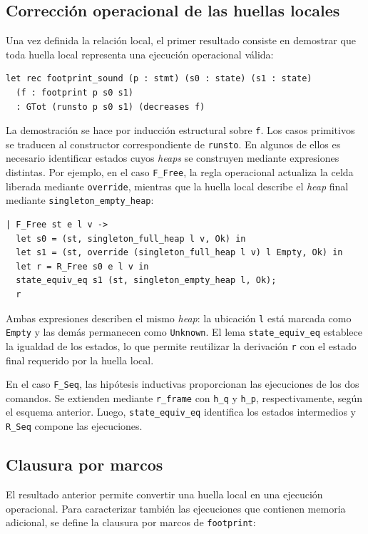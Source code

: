 \documentclass[a4paper,	11pt]{report}
\begin{document}
\subsection*{Corrección operacional de las huellas locales}
Una vez definida la relación local,
el primer resultado consiste en demostrar que toda huella local representa una ejecución operacional válida:

\begin{lstlisting}
let rec footprint_sound (p : stmt) (s0 : state) (s1 : state)
  (f : footprint p s0 s1)
  : GTot (runsto p s0 s1) (decreases f)
\end{lstlisting}

La demostración se hace por inducción estructural sobre \lstinline|f|.
Los casos primitivos se traducen al constructor correspondiente de \lstinline|runsto|.
En algunos de ellos es necesario identificar estados cuyos \emph{heaps} se construyen mediante expresiones distintas.
Por ejemplo,
en el caso \lstinline|F_Free|,
la regla operacional actualiza la celda liberada mediante \lstinline|override|,
mientras que la huella local describe el \emph{heap} final mediante \lstinline|singleton_empty_heap|:

\begin{lstlisting}
| F_Free st e l v ->
  let s0 = (st, singleton_full_heap l v, Ok) in
  let s1 = (st, override (singleton_full_heap l v) l Empty, Ok) in
  let r = R_Free s0 e l v in
  state_equiv_eq s1 (st, singleton_empty_heap l, Ok);
  r
\end{lstlisting}
Ambas expresiones describen el mismo \emph{heap}:
la ubicación \lstinline|l| está marcada como \lstinline|Empty| y las demás permanecen como \lstinline|Unknown|.
El lema \lstinline|state_equiv_eq| establece la igualdad de los estados,
lo que permite reutilizar la derivación \lstinline|r| con el estado final requerido por la huella local.

En el caso \lstinline|F_Seq|,
las hipótesis inductivas proporcionan las ejecuciones de los dos comandos.
Se extienden mediante \lstinline|r_frame| con \lstinline|h_q| y \lstinline|h_p|,
respectivamente,
según el esquema anterior.
Luego,
\lstinline|state_equiv_eq| identifica los estados intermedios y \lstinline|R_Seq| compone las ejecuciones.

\subsection*{Clausura por marcos}
El resultado anterior permite convertir una huella local en una ejecución operacional.
Para caracterizar también las ejecuciones que contienen memoria adicional,
se define la clausura por marcos de \lstinline|footprint|:
\end{document}
